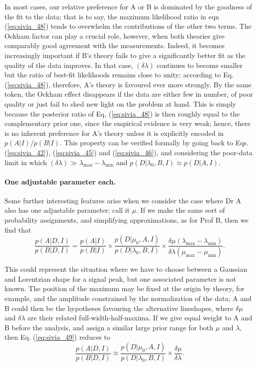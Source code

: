 \documentclass[%
oneside,                 %
final,                   %
10pt]{article}
\begin{document}
In most cases, our relative preference for A or B is dominated by the goodness of the fit to the data; that is to say, the maximum likelihood ratio in eqn (\ref{eq:sivia_48}) tends to overwhelm the contributions of the other two terms. The Ockham factor can play a crucial role, however, when both theories give comparably good agreement with the measurements. Indeed, it becomes increasingly important if B’s theory fails to give a significantly better fit as the quality of the data improves. In that case, $(\delta\lambda)$ continues to become smaller but the ratio of best-fit likelihoods remains close to unity; according to Eq. (\ref{eq:sivia_48}), therefore, A’s theory is favoured ever more strongly. By the same token, the Ockham effect disappears if the data are either few in number, of poor quality or just fail to shed new light on the problem at hand. This is simply because the posterior ratio of Eq. (\ref{eq:sivia_48}) is then roughly equal to the complementary prior one, since the empirical evidence is very weak; hence, there is no inherent preference for A’s theory unless it is explicitly encoded in $p(A|I)/p(B|I)$. This property can be verified formally by going back to Eqs. (\ref{eq:sivia_42}), (\ref{eq:sivia_45}) and (\ref{eq:sivia_46}), and considering the poor-data limit in which 
$(\delta\lambda) \gg \lambda_\mathrm{max}-\lambda_\mathrm{min}$ and $p(D|\lambda_0,B,I) \approx p(D|A,I)$.

\paragraph{One adjustable parameter each.}
Some further interesting features arise when we consider the case where Dr A also has one adjustable parameter; call it $\mu$. If we make the same sort of probability assignments, and simplifying approximations, as for Prof B, then we find that
\begin{equation}
\frac{p(A|D,I)}{p(B|D,I)} =  \frac{p(A|I)}{p(B|I)} \times \frac{p(D|\mu_0,A,I)}{p(D|\lambda_0,B,I)} \times \frac{\delta\mu(\lambda_\mathrm{max} - \lambda_\mathrm{min})}{\delta\lambda(\mu_\mathrm{max} - \mu_\mathrm{min})}. 
\label{eq:sivia_49}
\end{equation}

This could represent the situation where we have to choose between a Gaussian and Lorentzian shape for a signal peak, but one associated parameter is not known. The position of the maximum may be fixed at the origin by theory, for example, and the amplitude constrained by the normalization of the data; A and B could then be the hypotheses favouring the alternative lineshapes, where $\delta\mu$ and $\delta\lambda$ are their related full-width-half-maxima. If we give equal weight to A and B before the analysis, and assign a similar large prior range for both $\mu$ and $\lambda$, then Eq. (\ref{eq:sivia_49}) reduces to
$$
\frac{p(A|D,I)}{p(B|D,I)} \approx  \frac{p(D|\mu_0,A,I)}{p(D|\lambda_0,B,I)} \times \frac{\delta\mu}{\delta\lambda}. 
$$
\end{document}
